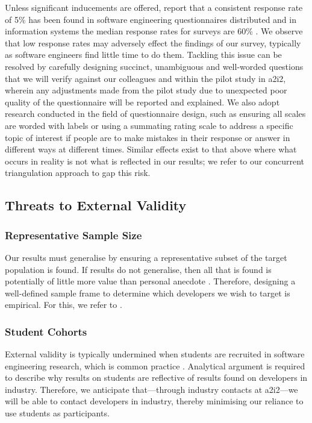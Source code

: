 Unless significant inducements are offered, \citet{Singer:2007tu} report that a consistent response rate of 5\% has been found in software engineering questionnaires distributed and in information systems the median response rates for surveys are 60\% \citep{Baruch:1999vf}. We observe that low response rates may adversely effect the findings of our survey, typically as software engineers find little time to do them. Tackling this issue can be resolved by carefully designing succinct, unambiguous and well-worded questions that we will verify against our colleagues and within the pilot study in \gls{a2i2}, wherein any adjustments made from the pilot study due to unexpected poor quality of the questionnaire will be reported and explained. We also adopt research conducted in the field of questionnaire design, such as ensuring all scales are worded with labels \citep{Krosnick:1999wt} or using a summating rating scale \citep{Spector:1992uj} to address a specific topic of interest if people are to make mistakes in their response or answer in different ways at different times. Similar effects exist to that above where what occurs in reality is not what is reflected in our results; we refer to our concurrent triangulation approach to gap this risk.

\subsection{Threats to External Validity}

\subsubsection{Representative Sample Size}

Our results must generalise by ensuring a representative subset of the target population is found. If results do not generalise, then all that is found is potentially of little more value than personal anecdote \citep{Kitchenham:2007ux}. Therefore, designing a well-defined sample frame to determine which developers we wish to target is empirical. For this, we refer to \citet{Kitchenham:2007ux}.

\subsubsection{Student Cohorts}

External validity is typically undermined when students are recruited in software engineering research, which is common practice \citep{Easterbrook:2007ws}. Analytical argument is required to describe why results on students are reflective of results found on developers in industry. Therefore, we anticipate that---through industry contacts at \gls{a2i2}---we will be able to contact developers in industry, thereby minimising our reliance to use students as participants. 

